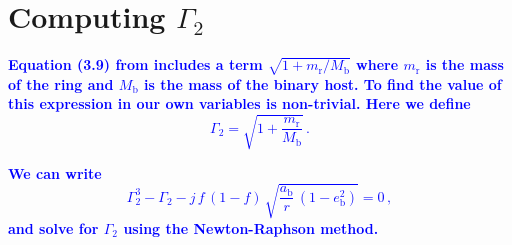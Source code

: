 \documentclass[twocolumn,linenumbers]{aastex631}
\newcommand{\RR}[1]{\textcolor{blue}{\bf#1}} %
\begin{document}
\appendix

\section{Computing $\Gamma_2$}
\RR{
Equation (3.9) from \citet{farago2010} includes a term $\sqrt{1 + m_\text{r}/M_\text{b}}$ where $m_\text{r}$ is the mass of the ring and $M_\text{b}$ is the mass of the binary host. To find the value of this expression in our own variables is non-trivial. Here we define
\begin{equation}
    \Gamma_2 = \sqrt{1 + \frac{m_\text{r}}{M_\text{b}}}\, .
\end{equation}
}

\RR{
We can write
\begin{equation}
    \label{eq:gamma2-eq}
    \Gamma_2^3 - \Gamma_2 - j\,f\,(1-f)\,\sqrt{\frac{a_\text{b}}{r}\,(1-e_\text{b}^2)} = 0\, ,
\end{equation}
and solve for $\Gamma_2$ using the Newton-Raphson method.
}


\end{document}
